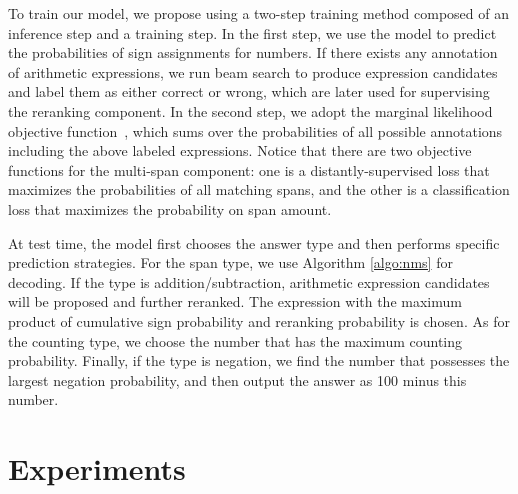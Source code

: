 \documentclass[11pt,a4paper]{article}
\begin{document}
To train our model, we propose using a two-step training method composed of an inference step and a training step.
In the first step, we use the model to predict the probabilities of sign assignments for numbers. 
If there exists any annotation of arithmetic expressions, we run beam search to produce expression candidates and label them as either correct or wrong, which are later used for supervising the reranking component.
In the second step, we adopt the marginal likelihood objective function~\cite{clark2017simple}, which sums over the probabilities of all possible annotations including the above labeled expressions.
Notice that there are two objective functions for the multi-span component: one is a distantly-supervised loss that maximizes the probabilities of all matching spans, and the other is a classification loss that maximizes the probability on span amount.

At test time, the model first chooses the answer type and then performs specific prediction strategies. 
For the span type, we use Algorithm \ref{algo:nms} for decoding.
If the type is addition/subtraction, arithmetic expression candidates will be proposed and further reranked.
The expression with the maximum product of cumulative sign probability and reranking probability is chosen.
As for the counting type, we choose the number that has the maximum counting probability.
Finally, if the type is negation, we find the number that possesses the largest negation probability, and then output the answer as 100 minus this number.
 \section{Experiments}
\end{document}
